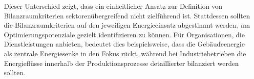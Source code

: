 Dieser Unterschied zeigt, dass ein einheitlicher Ansatz zur Definition von Bilanzraumkriterien sektorenübergreifend nicht zielführend ist. Stattdessen sollten die Bilanzraumkriterien auf den jeweiligen Energieeinsatz 
abgestimmt werden, um Optimierungspotenziale gezielt identifizieren zu können. Für Organisationen, die Dienstleistungen anbieten, bedeutet dies beispielsweise, dass die Gebäudeenergie als zentrale Energiesenke 
in den Fokus rückt, während bei Industriebetrieben die Energieflüsse innerhalb der Produktionsprozesse detaillierter bilanziert werden sollten.